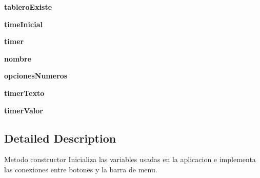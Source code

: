 \begin{DoxyCompactItemize}
\item 
\hypertarget{class_sudoku_main_window_1_1_sudoku_main_window_a549e0432a4386a67cb4ee4d3741c0835}{{\bfseries tablero\-Existe}}\label{class_sudoku_main_window_1_1_sudoku_main_window_a549e0432a4386a67cb4ee4d3741c0835}

\item 
\hypertarget{class_sudoku_main_window_1_1_sudoku_main_window_ade06c7abd46ed3d4385ebf0e01b670b1}{{\bfseries time\-Inicial}}\label{class_sudoku_main_window_1_1_sudoku_main_window_ade06c7abd46ed3d4385ebf0e01b670b1}

\item 
\hypertarget{class_sudoku_main_window_1_1_sudoku_main_window_ace319036ada7a045ab675ff38fa8ddb1}{{\bfseries timer}}\label{class_sudoku_main_window_1_1_sudoku_main_window_ace319036ada7a045ab675ff38fa8ddb1}

\item 
\hypertarget{class_sudoku_main_window_1_1_sudoku_main_window_ae9b4ab2489626295aa20808e8ffeeeca}{{\bfseries nombre}}\label{class_sudoku_main_window_1_1_sudoku_main_window_ae9b4ab2489626295aa20808e8ffeeeca}

\item 
\hypertarget{class_sudoku_main_window_1_1_sudoku_main_window_a370ea64e9453cab45cf57647f8ce6cf9}{{\bfseries opciones\-Numeros}}\label{class_sudoku_main_window_1_1_sudoku_main_window_a370ea64e9453cab45cf57647f8ce6cf9}

\item 
\hypertarget{class_sudoku_main_window_1_1_sudoku_main_window_a252168ae5d3f829d9403336f3c8893a3}{{\bfseries timer\-Texto}}\label{class_sudoku_main_window_1_1_sudoku_main_window_a252168ae5d3f829d9403336f3c8893a3}

\item 
\hypertarget{class_sudoku_main_window_1_1_sudoku_main_window_af4af3149f7ab37219efac57129609402}{{\bfseries timer\-Valor}}\label{class_sudoku_main_window_1_1_sudoku_main_window_af4af3149f7ab37219efac57129609402}

\end{DoxyCompactItemize}


\subsection{Detailed Description}
\begin{DoxyVerb}Metodo constructor
  Inicializa las variables usadas en la aplicacion e implementa las conexiones entre botones
  y la barra de menu.
\end{DoxyVerb}
 

